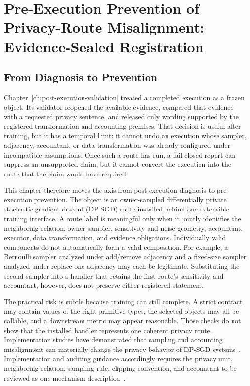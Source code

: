 \chapter[Pre-Execution Prevention of Privacy-Route Misalignment]{Pre-Execution Prevention of Privacy-Route Misalignment: Evidence-Sealed Registration}
\label{ch:evidence-sealed-registration}

\section{From Diagnosis to Prevention}
\label{sec:ch3-diagnosis-to-prevention}

Chapter~\ref{ch:post-execution-validation} treated a completed execution as a
frozen object.  Its validator reopened the available evidence, compared that
evidence with a requested privacy sentence, and released only wording supported by
the registered transformation and accounting premises.  That decision is useful
after training, but it has a temporal limit: it cannot undo an execution whose
sampler, adjacency, accountant, or data transformation was already configured
under incompatible assumptions.  Once such a route has run, a fail-closed report
can suppress an unsupported claim, but it cannot convert the execution into the
route that the claim would have required.

This chapter therefore moves the \AuditablePrivacy{} axis from post-execution
diagnosis to pre-execution prevention.  The object is an owner-sampled
differentially private stochastic gradient descent (DP-SGD) route installed behind
one extensible training interface.  A route label is meaningful only when it
jointly identifies the neighboring relation, owner sampler, sensitivity and noise
geometry, accountant, executor, data transformation, and evidence obligations.
Individually valid components do not automatically form a valid composition.  For
example, a Bernoulli sampler analyzed under add/remove adjacency and a fixed-size
sampler analyzed under replace-one adjacency may each be legitimate.  Substituting
the second sampler into a handler that retains the first route's sensitivity and
accountant, however, does not preserve either registered statement.

The practical risk is subtle because training can still complete.  A strict
contract may contain values of the right primitive types, the selected objects may
all be callable, and a downstream metric may appear reasonable.  Those checks do
not show that the installed handler represents one coherent privacy route.
Implementation studies have demonstrated that sampling and accounting
misalignment can materially change the privacy behavior of DP-SGD
systems~\cite{chua2024implementations}.  Implementation and auditing guidance
accordingly requires the privacy unit, neighboring relation, sampling rule,
clipping convention, and accountant to be reviewed as one mechanism
description~\cite{kifer2020guidelines,ponomareva2023dpify,near2025guidelines}.

